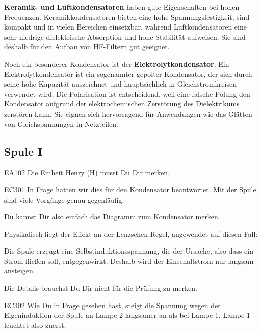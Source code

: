 \begin{ohmchapter}
  \textbf{Keramik- und Luftkondensatoren} haben gute Eigenschaften bei hohen Frequenzen. Keramikkondensatoren bieten eine hohe Spannungsfestigkeit, sind kompakt und in vielen Bereichen einsetzbar, während Luftkondensatoren eine sehr niedrige dielektrische Absorption und hohe Stabilität aufweisen. Sie sind deshalb für den Aufbau von HF-Filtern gut geeignet.

  Noch ein besonderer Kondensator ist der \textbf{Elektrolytkondensator}. Ein Elektrolytkondensator ist ein sogenannter gepolter Kondensator, der sich durch seine hohe Kapazität auszeichnet und hauptsächlich in Gleichstromkreisen verwendet wird. Die Polarisation ist entscheidend, weil eine falsche Polung den Kondensator aufgrund der elektrochemischen Zerstörung des Dielektrikums zerstören kann. Sie eignen sich hervorragend für Anwendungen wie das Glätten von Gleichspannungen in Netzteilen.

\end{ohmchapter}

\subsection{Spule I}

\begin{sol}{EA102}
  Die Einheit Henry (H) musst Du Dir merken.
\end{sol}

\begin{sol}{EC301}
 In Frage  hatten wir dies für den Kondensator beantwortet. Mit der Spule sind viele Vorgänge genau gegenläufig.

 Du kannst Dir also einfach das  Diagramm zum Kondensator merken.

 Physikalisch liegt der Effekt an der Lenzschen Regel, angewendet auf diesen Fall:

 Die Spule erzeugt eine Selbstinduktionsspannung, die der Ursache, also dass ein Strom fließen soll, entgegenwirkt. Deshalb wird der Einschaltstrom nur langsam ansteigen. 
 
 Die Details brauchst Du Dir nicht für die Prüfung zu merken.
\end{sol}


\begin{sol}{EC302}
  Wie Du in Frage  gesehen hast, steigt die Spannung wegen der Eigeninduktion der Spule an Lampe 2 langsamer an als bei Lampe 1. Lampe 1 leuchtet also zuerst.
\end{sol}

